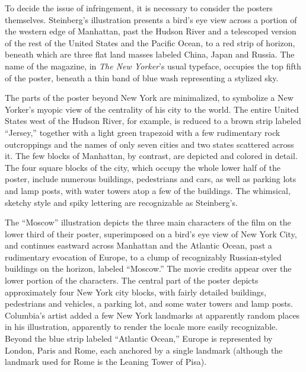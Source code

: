 To decide the issue of infringement, it is necessary to consider the posters
themselves. Steinberg's illustration presents a bird's eye view across a portion
of the western edge of Manhattan, past the Hudson River and a telescoped version
of the rest of the United States and the Pacific Ocean, to a red strip of
horizon, beneath which are three flat land masses labeled China, Japan and
Russia. The name of the magazine, in \textit{The New Yorker}'s usual typeface,
occupies the top fifth of the poster, beneath a thin band of blue wash
representing a stylized sky.

The parts of the poster beyond New York are minimalized, to symbolize a New
Yorker's myopic view of the centrality of his city to the world. The entire
United States west of the Hudson River, for example, is reduced to a brown strip
labeled ``Jersey,'' together with a light green trapezoid with a few rudimentary
rock outcroppings and the names of only seven cities and two states scattered
across it. The few blocks of Manhattan, by contrast, are depicted and colored in
detail. The four square blocks of the city, which occupy the whole lower half of
the poster, include numerous buildings, pedestrians and cars, as well as parking
lots and lamp posts, with water towers atop a few of the buildings. The
whimsical, sketchy style and spiky lettering are recognizable as Steinberg's.

The ``Moscow'' illustration depicts the three main characters of the film on the
lower third of their poster, superimposed on a bird's eye view of New York City,
and continues eastward across Manhattan and the Atlantic Ocean, past a
rudimentary evocation of Europe, to a clump of recognizably Russian-styled
buildings on the horizon, labeled ``Moscow.'' The movie credits appear over the
lower portion of the characters. The central part of the poster depicts
approximately four New York city blocks, with fairly detailed buildings,
pedestrians and vehicles, a parking lot, and some water towers and lamp posts.
Columbia's artist added a few New York landmarks at apparently random places in
his illustration, apparently to render the locale more easily recognizable.
Beyond the blue strip labeled ``Atlantic Ocean,'' Europe is represented by
London, Paris and Rome, each anchored by a single landmark (although the
landmark used for Rome is the Leaning Tower of Pisa).

